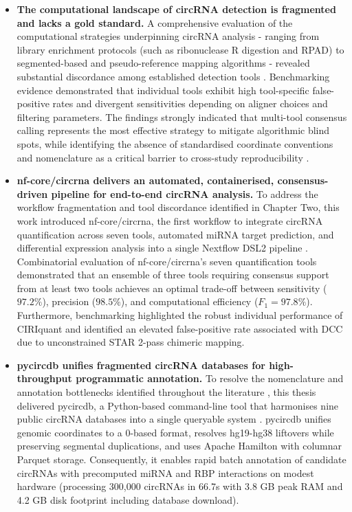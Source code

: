 \begin{itemize}
    \item \textbf{The computational landscape of circRNA detection is fragmented and lacks a gold standard.} A comprehensive evaluation of the computational strategies underpinning circRNA analysis - ranging from library enrichment protocols (such as ribonuclease R digestion and RPAD) to segmented-based and pseudo-reference mapping algorithms - revealed substantial discordance among established detection tools \cite{Panda2017Jul, Pandey2019Feb, Hansen2016Apr, Zeng2017Jun, Vromman2023Aug}. Benchmarking evidence demonstrated that individual tools exhibit high tool-specific false-positive rates and divergent sensitivities depending on aligner choices and filtering parameters. The findings strongly indicated that multi-tool consensus calling represents the most effective strategy to mitigate algorithmic blind spots, while identifying the absence of standardised coordinate conventions and nomenclature as a critical barrier to cross-study reproducibility \cite{CirComPara2, Chen2023Jan}.

    \item \textbf{nf-core/circrna delivers an automated, containerised, consensus-driven pipeline for end-to-end circRNA analysis.} To address the workflow fragmentation and tool discordance identified in Chapter Two, this work introduced nf-core/circrna, the first workflow to integrate circRNA quantification across seven tools, automated miRNA target prediction, and differential expression analysis into a single Nextflow DSL2 pipeline \cite{Digby2023Dec, DiTommaso2017, Ewels2020Mar}. Combinatorial evaluation of nf-core/circrna's seven quantification tools demonstrated that an ensemble of three tools requiring consensus support from at least two tools achieves an optimal trade-off between sensitivity ($97.2\%$), precision ($98.5\%$), and computational efficiency ($F_1 = 97.8\%$). Furthermore, benchmarking highlighted the robust individual performance of CIRIquant \cite{CIRIquant} and identified an elevated false-positive rate associated with DCC \cite{DCC} due to unconstrained STAR 2-pass chimeric mapping.

    \item \textbf{pycircdb unifies fragmented circRNA databases for high-throughput programmatic annotation.} To resolve the nomenclature and annotation bottlenecks identified throughout the literature \cite{Chen2023Jan}, this thesis delivered pycircdb, a Python-based command-line tool that harmonises nine public circRNA databases into a single queryable system \cite{Digby2024Dec}. pycircdb unifies genomic coordinates to a 0-based format, resolves hg19-hg38 liftovers while preserving segmental duplications, and uses Apache Hamilton with columnar Parquet storage. Consequently, it enables rapid batch annotation of candidate circRNAs with precomputed miRNA and RBP interactions on modest hardware (processing 300,000 circRNAs in 66.7s with 3.8 GB peak RAM and 4.2 GB disk footprint including database download).


\end{itemize}

